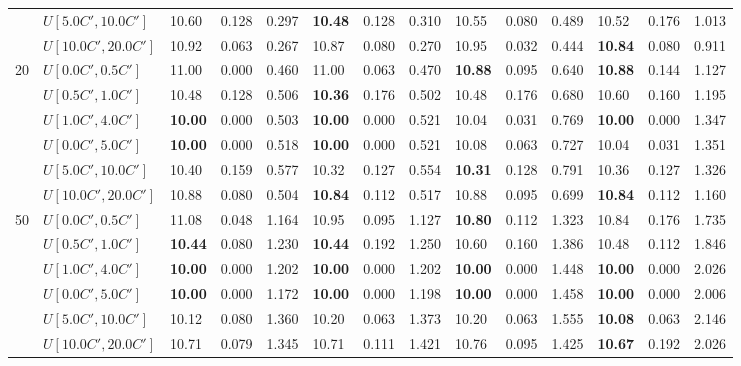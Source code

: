 \begin{table}[h]
{\begin{tabular}{|l|l||l|l|l||l|l|l||l|l|l||l|l|l|}
       & $U[5.0C',10.0C']$ & 10.60 & 0.128 & 0.297 & \textbf{10.48} & 0.128 & 0.310 & 10.55 & 0.080 & 0.489 & 10.52 & 0.176 & 1.013 \\
       & $U[10.0C',20.0C']$ & 10.92 & 0.063 & 0.267 & 10.87 & 0.080 & 0.270 & 10.95 & 0.032 & 0.444 & \textbf{10.84} & 0.080 & 0.911 \\
      \hline\hline
      \multirow{6}{*}{20} & $U[0.0C',0.5C']$ & 11.00 & 0.000 & 0.460 & 11.00 & 0.063 & 0.470 & \textbf{10.88} & 0.095 & 0.640 & \textbf{10.88} & 0.144 & 1.127 \\
       & $U[0.5C',1.0C']$ & 10.48 & 0.128 & 0.506 & \textbf{10.36} & 0.176 & 0.502 & 10.48 & 0.176 & 0.680 & 10.60 & 0.160 & 1.195 \\
       & $U[1.0C',4.0C']$ & \textbf{10.00} & 0.000 & 0.503 & \textbf{10.00} & 0.000 & 0.521 & 10.04 & 0.031 & 0.769 & \textbf{10.00} & 0.000 & 1.347 \\
       & $U[0.0C',5.0C']$ & \textbf{10.00} & 0.000 & 0.518 & \textbf{10.00} & 0.000 & 0.521 & 10.08 & 0.063 & 0.727 & 10.04 & 0.031 & 1.351 \\
       & $U[5.0C',10.0C']$ & 10.40 & 0.159 & 0.577 & 10.32 & 0.127 & 0.554 & \textbf{10.31} & 0.128 & 0.791 & 10.36 & 0.127 & 1.326 \\
       & $U[10.0C',20.0C']$ & 10.88 & 0.080 & 0.504 & \textbf{10.84} & 0.112 & 0.517 & 10.88 & 0.095 & 0.699 & \textbf{10.84} & 0.112 & 1.160 \\
      \hline\hline
      \multirow{6}{*}{50} & $U[0.0C',0.5C']$ & 11.08 & 0.048 & 1.164 & 10.95 & 0.095 & 1.127 & \textbf{10.80} & 0.112 & 1.323 & 10.84 & 0.176 & 1.735 \\
       & $U[0.5C',1.0C']$ & \textbf{10.44} & 0.080 & 1.230 & \textbf{10.44} & 0.192 & 1.250 & 10.60 & 0.160 & 1.386 & 10.48 & 0.112 & 1.846 \\
       & $U[1.0C',4.0C']$ & \textbf{10.00} & 0.000 & 1.202 & \textbf{10.00} & 0.000 & 1.202 & \textbf{10.00} & 0.000 & 1.448 & \textbf{10.00} & 0.000 & 2.026 \\
       & $U[0.0C',5.0C']$ & \textbf{10.00} & 0.000 & 1.172 & \textbf{10.00} & 0.000 & 1.198 & \textbf{10.00} & 0.000 & 1.458 & \textbf{10.00} & 0.000 & 2.006 \\
       & $U[5.0C',10.0C']$ & 10.12 & 0.080 & 1.360 & 10.20 & 0.063 & 1.373 & 10.20 & 0.063 & 1.555 & \textbf{10.08} & 0.063 & 2.146 \\
       & $U[10.0C',20.0C']$ & 10.71 & 0.079 & 1.345 & 10.71 & 0.111 & 1.421 & 10.76 & 0.095 & 1.425 & \textbf{10.67} & 0.192 & 2.026 \\
      \hline
      \end{tabular}
      }
      \label{tab:pcpn90p7}\end{table}


